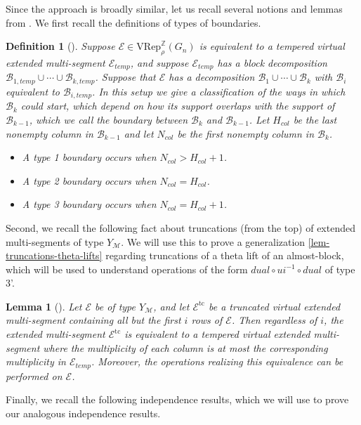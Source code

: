 \documentclass[11pt,letterpaper]{amsart}
\newcommand{\VRep}{{\mathrm{VRep}}}
\newcommand{\inv}{^{-1}}
\newcommand{\BB}{\mathcal{B}}
\newcommand{\EE}{\mathcal{E}}
\newcommand{\tc}{\operatorname{tc}}
\newtheorem{lemma}[thm]{Lemma}
\newtheorem{defn}[thm]{Definition}
\numberwithin{equation}{section}
\begin{document}
Since the approach is broadly similar, let us recall several notions and lemmas from \cite[\S 7]{HKT26}. We first recall the definitions of types of boundaries.

\begin{defn}[{\cite[Definition 7.11]{HKT26}}]
    Suppose $\EE\in\VRep_\rho^\mathbb{Z}(G_n)$ is  equivalent to a tempered virtual extended multi-segment $\EE_{temp}$, and suppose $\EE_{temp}$ has a block decomposition $\BB_{1, temp} \cup \cdots \cup \BB_{k, temp}$. Suppose that $\EE$ has a decomposition $\BB_1 \cup \cdots \cup \BB_k$ with $\BB_i$ equivalent to $\BB_{i, temp}$. In this setup we give a classification of the ways in which $\BB_k$ could start, which depend on how its support overlaps with the support of $\BB_{k-1}$, which we call the \emph{boundary} between $\BB_k$ and $\BB_{k-1}$. Let $H_{col}$ be the last nonempty column in $\BB_{k-1}$ and let $N_{col}$ be the first nonempty column in $\BB_k$.
    \begin{itemize}
        \item A \emph{type 1 boundary} occurs when $N_{col} > H_{col}+1$.
        \item A \emph{type 2 boundary} occurs when $N_{col} = H_{col}$.
        \item A \emph{type 3 boundary} occurs when $N_{col} = H_{col}+1$.
    \end{itemize}
\end{defn}

Second, we recall the following fact about truncations (from the top) of extended multi-segments of type $Y_\mathcal{M}$. We will use this to prove a generalization \ref{lem-truncations-theta-lifts} regarding truncations of a theta lift of an almost-block, which will be used to understand operations of the form $dual \circ ui\inv \circ dual$ of type 3'.

\begin{lemma}[{\cite[Lemma 7.10]{HKT26}}]
\label{lem-truncations}
    Let $\EE$ be of type $Y_\mathcal{M}$, and let $\EE^{\tc}$ be a truncated virtual extended multi-segment containing all but the first $i$ rows of $\EE$. Then regardless of $i$, the extended multi-segment $\EE^{\tc}$ is equivalent to a tempered virtual extended multi-segment where the multiplicity of each column is at most the corresponding multiplicity in $\EE_{temp}$. Moreover, the operations realizing this equivalence can be performed on $\EE$.
\end{lemma}

Finally, we recall the following independence results, which we will use to prove our analogous independence results.
\end{document}

